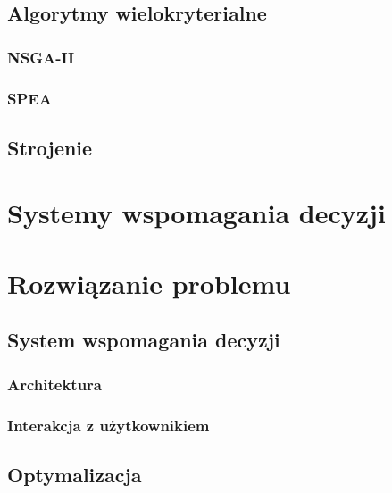 \documentclass[twoside]{iisthesis}
\begin{document}
\section{Algorytmy wielokryterialne}
\subsection{NSGA-II}
\subsection{SPEA}
\section{Strojenie}

\chapter{Systemy wspomagania decyzji}

\chapter{Rozwiązanie problemu}
\section{System wspomagania decyzji}
\subsection{Architektura}
\subsection{Interakcja z użytkownikiem}
\section{Optymalizacja}
\end{document}
